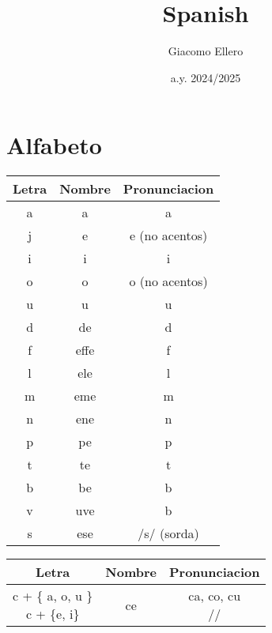 \documentclass[12pt]{extarticle}
\title{Spanish}
\author{Giacomo Ellero}
\date{a.y. 2024/2025}
\begin{document}
\oldfirstpage

\section{Alfabeto}

\begin{multicols}{2}
	\begin{center}
		\renewcommand{\arraystretch}{1.5}
		\begin{tabular}{|c|c|c|}
			\hline
			\textbf{Letra} & \textbf{Nombre} & \textbf{Pronunciacion} \\
			\hline
			a              & a               & a                      \\
			j              & e               & e (no acentos)         \\
			i              & i               & i                      \\
			o              & o               & o (no acentos)         \\
			u              & u               & u                      \\
			d              & de              & d                      \\
			f              & effe            & f                      \\
			l              & ele             & l                      \\
			m              & eme             & m                      \\
			n              & ene             & n                      \\
			p              & pe              & p                      \\
			t              & te              & t                      \\
			b              & be              & b                      \\
			v              & uve             & b                      \\
			s              & ese             & /s/ (sorda)            \\
			\hline
		\end{tabular}
		\begin{tabular}{|c|c|c|}
			\hline
			\textbf{Letra}  & \textbf{Nombre} & \textbf{Pronunciacion}               \\
			\hline
			\makecell{c + \{ a, o, u \}                                              \\ c + \{e, i\}}    & ce                  & \makecell{ca, co, cu \\ /\texttheta/ } \\

\end{tabular}
\end{center}
\end{multicols}
\end{document}
